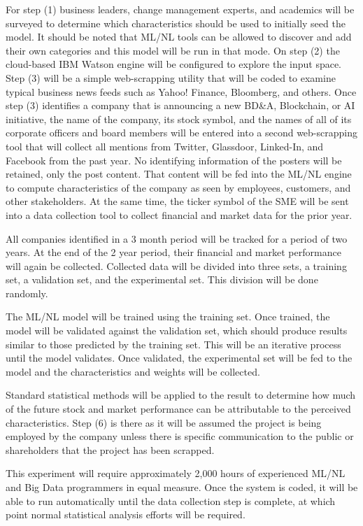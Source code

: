 For step (1) business leaders, change management experts, and academics will be surveyed to determine which characteristics should be used to initially seed the model. It should be noted that ML/NL tools can be allowed to discover and add their own categories and this model will be run in that mode. On step (2) the cloud-based IBM Watson\texttrademark{} engine will be configured to explore the input space. Step (3) will be a simple web-scrapping utility that will be coded to examine typical business news feeds such as Yahoo! Finance, Bloomberg, and others. Once step (3) identifies a company that is announcing a new BD\&A, Blockchain, or AI initiative, the name of the company, its stock symbol, and the names of all of its corporate officers and board members will be entered into a second web-scrapping tool that will collect all mentions from Twitter, Glassdoor, Linked-In, and Facebook from the past year. No identifying information of the posters will be retained, only the post content. That content will be fed into the ML/NL engine to compute characteristics of the company as seen by employees, customers, and other stakeholders. At the same time, the ticker symbol of the SME will be sent into a data collection tool to collect financial and market data for the prior year.

All companies identified in a 3 month period will be tracked for a period of two years. At the end of the 2 year period, their financial and market performance will again be collected. Collected data will be divided into three sets, a training set, a validation set, and the experimental set. This division will be done randomly.

The ML/NL model will be trained using the training set. Once trained, the model will be validated against the validation set, which should produce results similar to those predicted by the training set. This will be an iterative process until the model validates. Once validated, the experimental set will be fed to the model and the characteristics and weights will be collected.

Standard statistical methods will be applied to the result to determine how much of the future stock and market performance can be attributable to the perceived characteristics. Step (6) is there as it will be assumed the project is being employed by the company unless there is specific communication to the public or shareholders that the project has been scrapped.

This experiment will require approximately 2,000 hours of experienced ML/NL and Big Data programmers in equal measure. Once the system is coded, it will be able to run automatically until the data collection step is complete, at which point normal statistical analysis efforts will be required.
